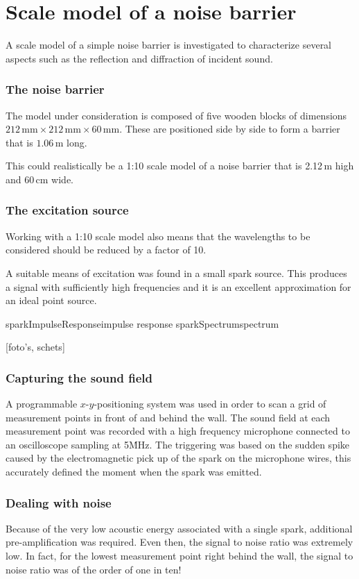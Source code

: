 \section{Scale model of a noise barrier}
A scale model of a simple noise barrier is investigated to characterize several aspects such as the reflection and diffraction of incident sound.

\subsubsection*{The noise barrier}
The model under consideration is composed of five wooden blocks of dimensions $212\,\mathrm{mm} \times 212\,\mathrm{mm} \times 60\,\mathrm{mm}$. These are positioned side by side to form a barrier that is $1.06\,\mathrm{m}$ long.

This could realistically be a 1:10 scale model of a noise barrier that is 2.12\,m high and 60\,cm wide. 

\subsubsection*{The excitation source}
Working with a 1:10 scale model also means that the wavelengths to be considered should be reduced by a factor of 10.

A suitable means of excitation was found in a small spark source. This produces a signal with sufficiently high frequencies and it is an excellent approximation for an ideal point source.

	{sparkImpulseResponse}{impulse response}
	{sparkSpectrum}{spectrum}



[foto's, schets]

\subsubsection*{Capturing the sound field}
A programmable $x$-$y$-positioning system was used in order to scan a grid of measurement points in front of and behind the wall. The sound field at each measurement point was recorded with a high frequency microphone connected to an oscilloscope sampling at 5\.MHz. The triggering was based on the sudden spike caused by the electromagnetic pick up of the spark on the microphone wires, this accurately defined the moment when the spark was emitted.


\subsubsection*{Dealing with noise}
Because of the very low acoustic energy associated with a single spark, additional pre-amplification was required. Even then, the signal to noise ratio was extremely low. In fact, for the lowest measurement point right behind the wall, the signal to noise ratio was of the order of one in ten!

